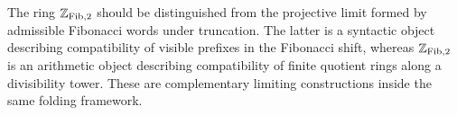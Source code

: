 \begin{remark}\label{rem:fib-adic-vs-syntax}
The ring \(\mathbb{Z}_{\mathrm{Fib},2}\) should be distinguished from the projective limit formed by admissible Fibonacci words under truncation. The latter is a syntactic object describing compatibility of visible prefixes in the Fibonacci shift, whereas \(\mathbb{Z}_{\mathrm{Fib},2}\) is an arithmetic object describing compatibility of finite quotient rings along a divisibility tower. These are complementary limiting constructions inside the same folding framework.
\end{remark}

